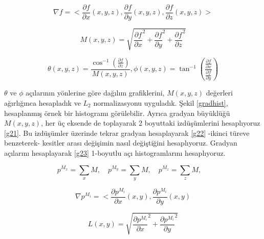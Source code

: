 \documentclass[conference]{IEEEtran}
\begin{document}
\begin{equation}
\nabla f = <\frac{\partial f}{\partial x} (x,y,z),
			\frac{\partial f}{\partial y} (x,y,z),
			\frac{\partial f}{\partial z} (x,y,z)>
\label{eqg1}
\end{equation}

\begin{equation}
M(x, y, z) = \sqrt{\frac{\partial f}{\partial x}^2 + \frac{\partial f}{\partial y}^2 + \frac{\partial f}{\partial z}^2}
\label{eqg2}
\end{equation}

\begin{equation}
\theta(x, y, z) = \frac{\cos^{-1}(\frac{\partial f}{\partial z})}{M(x, y, z)}, \phi(x, y, z) = \tan^{-1}(\frac{\frac{\partial f}{\partial x}}{\frac{\partial f}{\partial y}})
\label{eqg3}
\end{equation}

$\theta$ ve $\phi$ açılarının yönlerine göre dağılım grafiklerini, $M(x, y, z)$ değerleri ağırlığınca hesapladık ve $L_2$ \cite{dalal2005} normalizasyonu uyguladık. Şekil \ref{gradhist}, hesaplanmış örnek bir histogramı görülebilir. Ayrıca gradyan büyüklüğü $M(x, y, z)$, her üç eksende de toplayarak 2 boyuttaki izdüşümlerini hesaplıyoruz \ref{g21}. Bu izdüşümler üzerinde tekrar gradyan hesaplayarak \ref{g22} -ikinci türeve benzeterek- kesitler arası değişimin nasıl değiştiğini hesaplıyoruz. Gradyan açılarını hesaplayarak \ref{g23} 1-boyutlu açı histogramlarını hesaplıyoruz.
 
 \begin{equation}
 p^{M_x} = \sum_x{M}, \quad
 p^{M_y} = \sum_y{M}, \quad
 p^{M_z} = \sum_z{M}, \quad
\label{g21}
\end{equation}

\begin{equation}
\nabla p^{M_i} = <\frac{\partial p^{M_i}}{\partial x} (x,y),
			\frac{\partial p^{M_i}}{\partial y} (x,y)
\label{g22}
\end{equation}

\begin{equation}
L(x, y) = \sqrt{\frac{\partial p^{M_i}}{\partial x}^2 + \frac{\partial p^{M_i}}{\partial y}^2}
\label{g23}
\end{equation}
\end{document}
